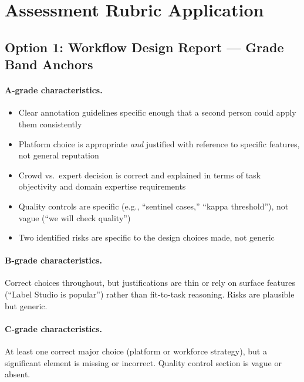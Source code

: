 \section{Assessment Rubric Application}

\subsection{Option 1: Workflow Design Report --- Grade Band Anchors}

\paragraph{A-grade characteristics.}
\begin{itemize}
    \item Clear annotation guidelines specific enough that a second person could apply them consistently
    \item Platform choice is appropriate \emph{and} justified with reference to specific features, not general reputation
    \item Crowd vs.\ expert decision is correct and explained in terms of task objectivity and domain expertise requirements
    \item Quality controls are specific (e.g., ``sentinel cases,'' ``kappa threshold''), not vague (``we will check quality'')
    \item Two identified risks are specific to the design choices made, not generic
\end{itemize}

\paragraph{B-grade characteristics.}
Correct choices throughout, but justifications are thin or rely on surface features (``Label Studio is popular'') rather than fit-to-task reasoning. Risks are plausible but generic.

\paragraph{C-grade characteristics.}
At least one correct major choice (platform or workforce strategy), but a significant element is missing or incorrect. Quality control section is vague or absent.

